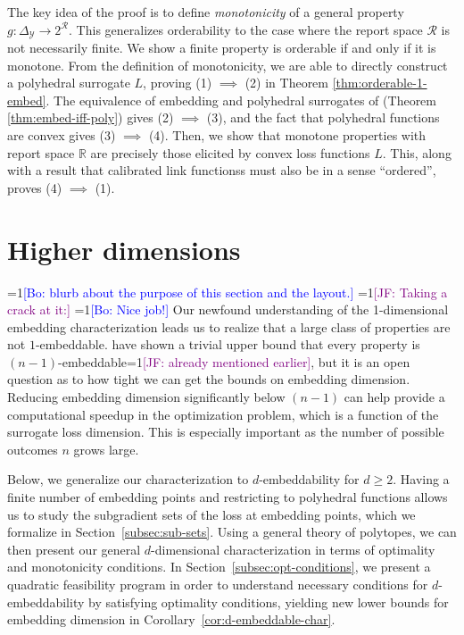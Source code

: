 \documentclass[anon]{colt2020} %
\newcommand{\Comments}{1}
\newcommand{\mynote}[2]{\ifnum\Comments=1\textcolor{#1}{#2}\fi}
\newcommand{\jessie}[1]{\mynote{purple}{[JF: #1]}}
\newcommand{\bo}[1]{\mynote{blue}{[Bo: #1]}}
\newcommand{\reals}{\mathbb{R}}
\newcommand{\simplex}{\Delta_\Y}
\newcommand{\R}{\mathcal{R}}
\newcommand{\Y}{\mathcal{Y}}
\begin{document}
The key idea of the proof is to define \emph{monotonicity} of a general property $g: \simplex \to 2^{\R}$.
This generalizes orderability to the case where the report space $\R$ is not necessarily finite.
We show a finite property is orderable if and only if it is monotone.
From the definition of monotonicity, we are able to directly construct a polyhedral surrogate $L$, proving (1) $\implies$ (2) in Theorem \ref{thm:orderable-1-embed}.
The equivalence of embedding and polyhedral surrogates of \cite{finocchiaro2019embedding} (Theorem \ref{thm:embed-iff-poly}) gives (2) $\implies$ (3), and the fact that polyhedral functions are convex gives (3) $\implies$ (4).
Then, we show that monotone properties with report space $\reals$ are precisely those elicited by convex loss functions $L$.
This, along with a result that calibrated link functionss must also be in a sense ``ordered'', proves (4) $\implies$ (1).



\section{Higher dimensions}\label{sec:d-dim}
\bo{blurb about the purpose of this section and the layout.}
\jessie{Taking a crack at it:}
\bo{Nice job!}
Our newfound understanding of the 1-dimensional embedding characterization leads us to realize that a large class of properties are not $1$-embeddable.
\cite{finocchiaro2019embedding} have shown a trivial upper bound that every property is $(n-1)$-embeddable\jessie{already mentioned earlier}, but it is an open question as to how tight we can get the bounds on embedding dimension.
Reducing embedding dimension significantly below $(n-1)$ can help provide a computational speedup in the optimization problem, which is a function of the surrogate loss dimension.
This is especially important as the number of possible outcomes $n$ grows large.

Below, we generalize our characterization to $d$-embeddability for $d \geq 2$.
Having a finite number of embedding points and restricting to polyhedral functions allows us to study the subgradient sets of the loss at embedding points, which we formalize in Section~\ref{subsec:sub-sets}.
Using a general theory of polytopes, we can then present our general $d$-dimensional characterization in terms of optimality and monotonicity conditions.
In Section~\ref{subsec:opt-conditions}, we present a quadratic feasibility program in order to understand necessary conditions for $d$-embeddability by satisfying optimality conditions, yielding new lower bounds for embedding dimension in Corollary~\ref{cor:d-embeddable-char}.
\end{document}
